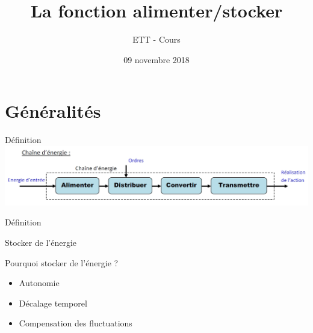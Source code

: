 \documentclass{beamer}
\title{La fonction alimenter/stocker}
\subtitle{}
\author{ETT - Cours}
\institute{IUT de Cachan}
\date{09 novembre 2018}
\begin{document}
    \begin{frame}
        \maketitle
    \end{frame}
    
    \begin{frame}
        \tableofcontents
    \end{frame}
    
    \section{Généralités}
    \begin{frame}{Définition}
        \includegraphics[width=\textwidth]{Cours/Premieres/ETT/Seq03_alimenter/S03C01_chaine_energie_alimenter/images/chaine.jpg}
        \begin{exampleblock}{Définition}
        \end{exampleblock}
    \end{frame}
    
    \begin{frame}{Stocker de l'énergie}
    \begin{block}{Pourquoi stocker de l'énergie ? }
\begin{itemize}
    \item Autonomie 
    \item Décalage temporel
    \item Compensation des fluctuations
\end{itemize}
\end{block}
    \end{frame}
    
\end{document}
